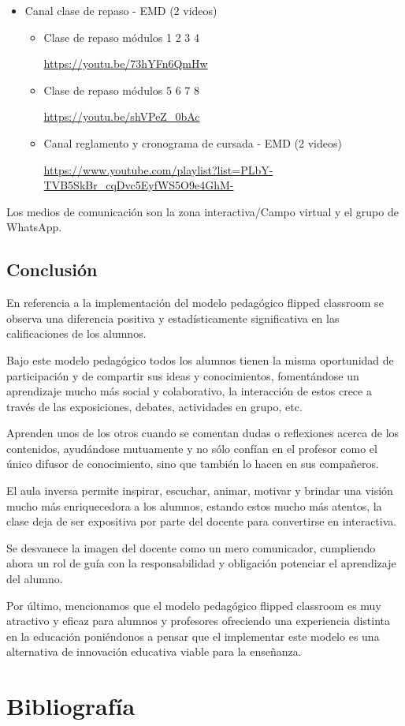 \documentclass[oneside,spanish]{amsart}
\numberwithin{equation}{section}
\numberwithin{figure}{section}
\theoremstyle{definition}
\begin{document}
\begin{itemize}
	\item Canal clase de repaso - EMD (2 videos)
	\begin{itemize}
		\item Clase de repaso módulos 1 2 3 4
		
		\url{https://youtu.be/73hYFn6QmHw}
		
		\item Clase de repaso módulos 5 6 7 8
		
		\url{https://youtu.be/shVPeZ_0bAc}
		
		\item Canal reglamento y cronograma de cursada - EMD (2 videos)
		
		\url{https://www.youtube.com/playlist?list=PLbY-TVB5SkBr_cqDvc5EyfWS5O9e4GhM-}
	\end{itemize}
\end{itemize}

Los medios de comunicación son la zona interactiva/Campo virtual y el grupo de WhatsApp.

\subsection{Conclusión}

En referencia a la implementación del modelo pedagógico flipped classroom se observa una diferencia positiva y estadísticamente significativa en las calificaciones de los alumnos. 

Bajo este modelo pedagógico todos los alumnos tienen la misma oportunidad de participación y de compartir sus ideas y conocimientos, fomentándose un aprendizaje mucho más social y colaborativo, la interacción de estos crece a través de las exposiciones, debates, actividades en grupo, etc. 

Aprenden unos de los otros cuando se comentan dudas o reflexiones acerca de los contenidos, ayudándose mutuamente y no sólo confían en el profesor como el único difusor de conocimiento, sino que también lo hacen en sus compañeros.

El aula inversa permite inspirar, escuchar, animar, motivar y brindar una visión mucho más enriquecedora a los alumnos, estando estos mucho más atentos, la clase deja de ser expositiva por parte del docente para convertirse en interactiva.

Se desvanece la imagen del docente como un mero comunicador, cumpliendo ahora un rol de guía con la responsabilidad y obligación potenciar el aprendizaje del alumno.  

Por último, mencionamos que el modelo pedagógico flipped classroom es muy atractivo y eficaz para alumnos y profesores ofreciendo una experiencia distinta en la educación poniéndonos a pensar que el implementar este modelo es una alternativa de innovación educativa viable para la enseñanza.

\section{Bibliografía}

\nocite{*}
\printbibliography
\end{document}
